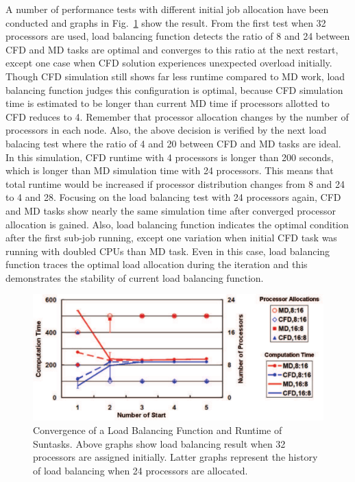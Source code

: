 \documentclass[conference,final]{IEEEtran}
\begin{document}
A number of performance tests with different initial job allocation have been conducted and graphs in Fig.~\ref{fig:LB_Graph} show the result. From the first test when 32 processors are used, load balancing function detects the ratio of 8 and 24 between CFD and MD tasks are optimal and converges to this ratio at the next restart, except one case when CFD solution experiences unexpected overload initially. Though CFD simulation still shows far less runtime compared to MD work, load balancing function judges this configuration is optimal, because CFD simulation time is estimated to be longer than current MD time if processors allotted to CFD reduces to 4. Remember that processor allocation changes by the number of processors in each node. Also, the above decision is verified by the next load balacing test where the ratio of 4 and 20 between CFD and MD tasks are ideal. In this simulation, CFD runtime with 4 processors is longer than 200 seconds, which is longer than MD simulation time with 24 processors. This means that total runtime would be increased if processor distribution changes from 8 and 24 to 4 and 28. Focusing on the load balancing test with 24 processors again, CFD and MD tasks show nearly the same simulation time after converged processor allocation is gained. Also, load balancing function indicates the optimal condition after the first sub-job running, except one variation when initial CFD task was running with doubled CPUs than MD task. Even in this case, load balancing function traces the optimal load allocation during the iteration and this demonstrates the stability of current load balancing function.

\begin{figure}
\centering
\includegraphics[scale=0.25]{LB_Graph}
\caption{\small Convergence of a Load Balancing Function and Runtime of Suntasks. Above graphs show load balancing result when 32 processors are assigned initially. Latter graphs represent the history of load balancing when 24 processors are allocated.}
\label{fig:LB_Graph}
\end{figure}
\end{document}
